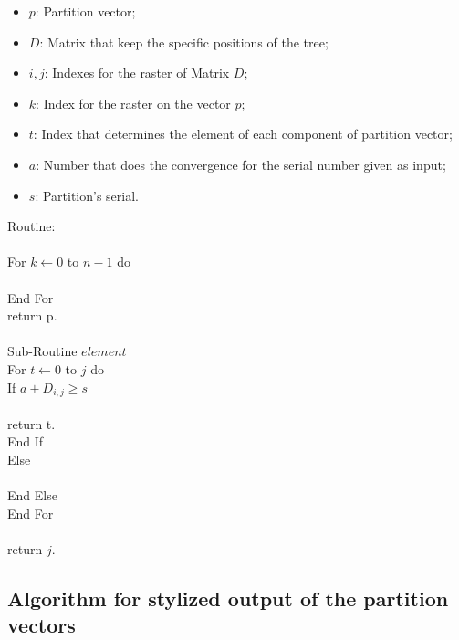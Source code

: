 \documentclass {amsart}
\begin{document}
\begin{itemize}

\item {$p$}: Partition vector;

\item {$D$}: Matrix that keep the specific positions of the tree;

\item {$i,j$}: Indexes for the raster of Matrix {$D$};

\item {$k$}: Index for the raster on the vector {$p$};

\item {$t$}: Index that determines the element of each component
of partition vector;

\item {$a$}: Number that does the convergence for the serial
number given as input;

\item {$s$}: Partition's serial.

\end{itemize}
Routine: \\
\\
\indent For {$k \leftarrow 0$} to {$n-1$} do\\
\indent {}\\
\indent End For \\
return p.\\\\
Sub-Routine {$element$}\\
\indent For {$t \leftarrow 0$} to {$j$} do\\
\indent \indent If {$a + D_{i,j} \geq s$}\\
\indent \indent {}\\
\indent \indent \indent return t.\\
\indent \indent End If\\
\indent \indent Else\\
\indent \indent {}\\
\indent \indent End Else \\
\indent End For\\
 \\
return {$j$}.

\subsection*{Algorithm for stylized output of the partition vectors}
\end{document}

